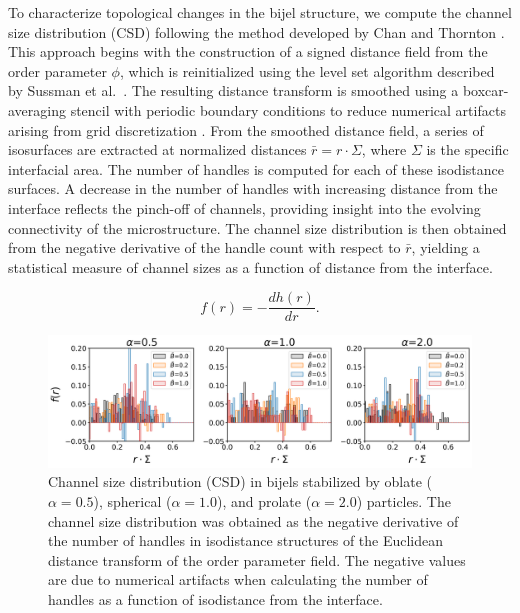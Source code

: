 
To characterize topological changes in the bijel structure, we compute the channel size distribution (CSD) following the method developed by Chan and Thornton \cite{chan_channel_2012}. This approach begins 
with the construction of a signed distance field from the order parameter \(\phi\), which is reinitialized using the level set algorithm described by Sussman et al.~\cite{sussman_level_1994, chan_channel_2012}. 
The resulting distance transform is smoothed using a boxcar-averaging stencil with periodic boundary conditions to reduce numerical artifacts arising from grid discretization \cite{chan_channel_2012}. 
From the smoothed distance field, a series of isosurfaces are extracted at normalized distances \(\bar{r} = r \cdot \Sigma\), where \(\Sigma\) is the specific interfacial area. The number of handles is computed 
for each of these isodistance surfaces. A decrease in the number of handles with increasing distance from the interface reflects the pinch-off of channels, providing insight into the evolving connectivity of the 
microstructure. The channel size distribution is then obtained from the negative derivative of the handle count with respect to \(\bar{r}\), yielding a statistical measure of channel sizes as a function of 
distance from the interface.

\begin{equation}
f(r) = - \frac{d h(r)}{dr} .
\end{equation}

\begin{figure}
    \centering
\includegraphics[scale = 0.4]{../figures/results/paper1_5/CSD.png}%
\caption{Channel size distribution (CSD) in bijels stabilized by oblate ($\alpha=0.5$), spherical ($\alpha=1.0$), and prolate ($\alpha=2.0$) particles. 
         The channel size distribution was obtained as the negative derivative of the number of handles in isodistance structures of the Euclidean distance 
         transform of the order parameter field. The negative values are due to numerical artifacts when calculating the number of handles as a function of 
         isodistance from the interface.}
\label{fig:CSD}%
\end{figure}


